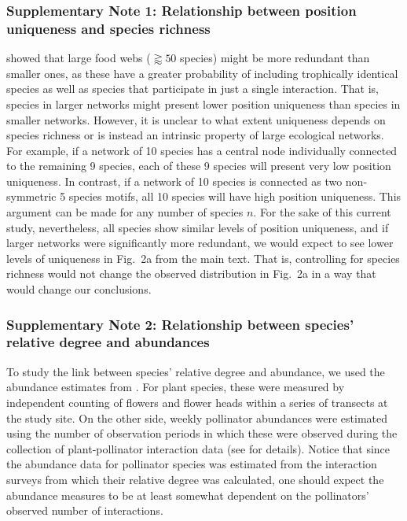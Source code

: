 \documentclass[11pt, a4paper]{article}
\begin{document}
\subsubsection*{Supplementary Note 1: Relationship between position uniqueness and species richness}
\citet{mora2018identifying} showed that large food webs ($\gtrapprox50$ species) might be more redundant than smaller ones, as these have a greater probability of including trophically identical species as well as species that participate in just a single interaction. That is, species in larger networks might present lower position uniqueness than species in smaller networks. However, it is unclear to what extent uniqueness depends on species richness or is instead an intrinsic property of large ecological networks. For example, if a network of 10 species has a central node individually connected to the remaining 9 species, each of these 9 species will present very low position uniqueness. In contrast, if a network of 10 species is connected as two non-symmetric 5 species motifs, all 10 species will have high position uniqueness. This argument can be made for any number of species $n$. For the sake of this current study, nevertheless, all species show similar levels of position uniqueness, and if larger networks were significantly more redundant, we would expect to see lower levels of uniqueness in Fig.~2a from the main text. That is, controlling for species richness would not change the observed distribution in Fig.~2a in a way that would change our conclusions. 

\subsubsection*{Supplementary Note 2: Relationship between species' relative degree and abundances}
To study the link between species' relative degree and abundance, we used the abundance estimates from \citet{caradonna2017interaction}. For plant species, these were measured by independent counting of flowers and flower heads within a series of transects at the study site. On the other side, weekly pollinator abundances were estimated using the number of observation periods in which these were observed during the collection of plant-pollinator interaction data (see \citealt{caradonna2017interaction} for details). Notice that since the abundance data for pollinator species was estimated from the interaction surveys from which their relative degree was calculated, one should expect the abundance measures to be at least somewhat dependent on the pollinators' observed number of interactions.
\end{document}
